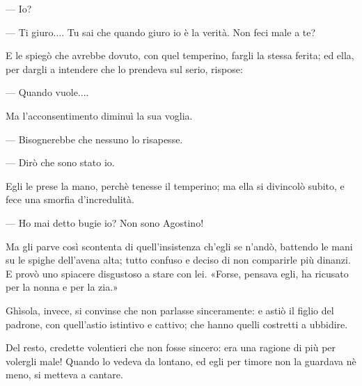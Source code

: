 — Io?

— Ti giuro.... Tu sai che quando giuro io è la verità. Non feci male a te?

E le spiegò che avrebbe dovuto, con quel temperino, fargli la stessa ferita; ed ella, per dargli a intendere che lo prendeva sul serio, rispose:

— Quando vuole....

Ma l'acconsentimento diminuì la sua voglia.

— Bisognerebbe che nessuno lo risapesse.

— Dirò che sono stato io.

Egli le prese la mano, perchè tenesse il temperino; ma ella si divincolò subito, e fece una smorfia d'incredulità.

— Ho mai detto bugie io? Non sono Agostino!

Ma gli parve così scontenta di quell’insistenza ch’egli se n’andò, battendo le mani su le spighe dell’avena alta; tutto confuso e deciso di non comparirle più dinanzi. E provò uno spiacere disgustoso a stare con lei. «Forse, pensava egli, ha ricusato per la nonna e per la zia.»

Ghìsola, invece, si convinse che non parlasse sinceramente: e astiò il figlio del padrone, con quell’astio istintivo e cattivo; che hanno quelli costretti a ubbidire.

Del resto, credette volentieri che non fosse sincero: era una ragione di più per volergli male! Quando lo vedeva da lontano, ed egli per timore non la guardava nè meno, si metteva a cantare.
